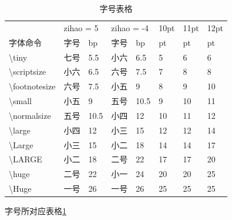 \documentclass[12pt]{ctexbook}  %
\begin{document}
	
	\begin{table}[h]
		\centering
		\caption{字号表格}
		\label{chen}
		\begin{tabular}{|l|ll|ll|l|l|l|}
			\hline
			\multicolumn{1}{|c|}{}       & \multicolumn{2}{l|}{zihao = 5} & \multicolumn{2}{l|}{zihao = -4} & 10pt & 11pt & 12pt \\ \cline{1-1}
			字体命令                         & 字号            & bp             & 字号            & bp              & pt   & pt   & pt   \\ \hline
			\textbackslash{}tiny         & 七号            & 5.5            & 小六            & 6.5             & 5    & 6    & 6    \\ \cline{1-1} \cline{6-8} 
			\textbackslash{}scriptsize   & 小六            & 6.5            & 六号            & 7.5             & 7    & 8    & 8    \\ \cline{1-1} \cline{6-8} 
			\textbackslash{}footnotesize & 六号            & 7.5            & 小五            & 9               & 8    & 9    & 10   \\ \cline{1-1} \cline{6-8} 
			\textbackslash{}small        & 小五            & 9              & 五号            & 10.5            & 9    & 10   & 11   \\ \cline{1-1} \cline{6-8} 
			\textbackslash{}normalsize   & 五号            & 10.5           & 小四            & 12              & 10   & 11   & 12   \\ \cline{1-1} \cline{6-8} 
			\textbackslash{}large        & 小四            & 12             & 小三            & 15              & 12   & 12   & 14   \\ \cline{1-1} \cline{6-8} 
			\textbackslash{}Large        & 小三            & 15             & 小二            & 18              & 14   & 14   & 17   \\ \cline{1-1} \cline{6-8} 
			\textbackslash{}LARGE        & 小二            & 18             & 二号            & 22              & 17   & 17   & 20   \\ \cline{1-1} \cline{6-8} 
			\textbackslash{}huge         & 二号            & 22             & 小一            & 24              & 20   & 20   & 25   \\ \cline{1-1} \cline{6-8} 
			\textbackslash{}Huge         & 一号            & 26             & 一号            & 26              & 25   & 25   & 25   \\ \hline
		\end{tabular}
	\end{table}
	字号所对应表格\ref{chen}
\end{document}
